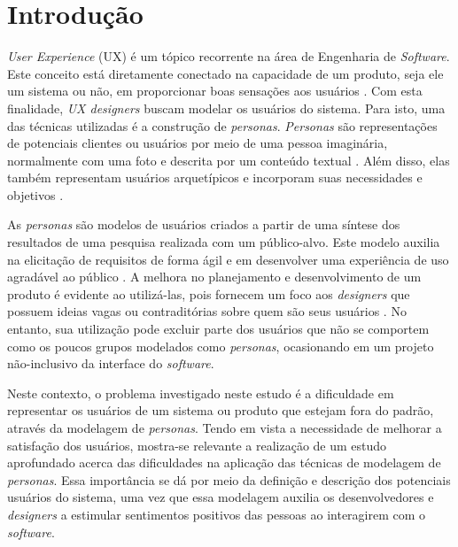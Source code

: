 \documentclass[12pt]{article}
\begin{document}
\section{Introdução} \label{sec:introducao}
\emph{User Experience} (UX) é um tópico recorrente na área de Engenharia de \emph{Software}. Este conceito está diretamente conectado na capacidade de um produto, seja ele um sistema ou não, em proporcionar boas sensações aos usuários \cite{10.1145/3357155.3358444}. Com esta finalidade, \emph{UX designers} buscam modelar os usuários do sistema. Para isto, uma das técnicas utilizadas é a construção de \emph{personas}. \emph{Personas} são representações de potenciais clientes ou usuários por meio de uma pessoa imaginária, normalmente com uma foto e descrita por um conteúdo textual \cite{10.1145/3265986}. Além disso, elas também representam usuários arquetípicos e incorporam suas necessidades e objetivos \cite{10.1145/1978942.1979274}. 

\par As \emph{personas} são modelos de usuários criados a partir de uma síntese dos resultados de uma pesquisa realizada com um público-alvo. Este modelo auxilia na elicitação de requisitos de forma ágil e em desenvolver uma experiência de uso agradável ao público \cite{10.1145/3274192.3274210}. A melhora no planejamento e desenvolvimento de um produto é evidente ao utilizá-las, pois fornecem um foco aos \emph{designers} que possuem ideias vagas ou contraditórias sobre quem são seus usuários \cite{10.1145/3027063.3053355}. No entanto, sua utilização pode excluir parte dos usuários que não se comportem como os poucos grupos modelados como \emph{personas}, ocasionando em um projeto não-inclusivo da interface do \emph{software}.

\par Neste contexto, o problema investigado neste estudo é a dificuldade em representar os usuários de um sistema ou produto que estejam fora do padrão, através da modelagem de \emph{personas}. Tendo em vista a necessidade de melhorar a satisfação dos usuários, mostra-se relevante a realização de um estudo aprofundado acerca das dificuldades na aplicação das técnicas de modelagem de \emph{personas}. Essa importância se dá por meio da definição e descrição dos potenciais usuários do sistema, uma vez que essa modelagem auxilia os desenvolvedores e \emph{designers} a estimular sentimentos positivos das pessoas ao interagirem com o \emph{software}.
\end{document}
